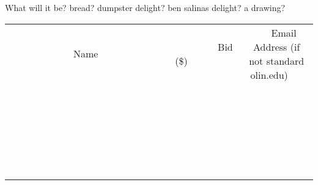 \documentclass[11pt]{article}
\begin{document}
What will it be? bread?  dumpster delight? ben salinas delight? a drawing?
\\[6ex]
\begin{tabular}{c c c}
~~~~~~~~~~~~~Name~~~~~~~~~~~~~ & ~~~~~~~~~Bid (\$)~~~~~~~~~  & ~~~Email Address (if not standard olin.edu)~~~\\
 & & \\
\hline
 & & \\
\hline
 & & \\
\hline
 & & \\
\hline
 & & \\
\hline
 & & \\
\hline
 & & \\
\hline
 & & \\
\hline
 & & \\
\hline
 & & \\
\hline
 & & \\
\hline
 & & \\
\hline
 & & \\
\hline
 & & \\
\hline
 & & \\
\hline
 & & \\
\hline
 & & \\
\hline
 & & \\
\hline
 & & \\
\hline
 & & \\
\hline
 & & \\
\hline
 & & \\
\hline
 & & \\
\hline
 & & \\
\hline
 & & \\
\hline
 & & \\
\hline
\end{tabular}
\newpage
\end{document}
